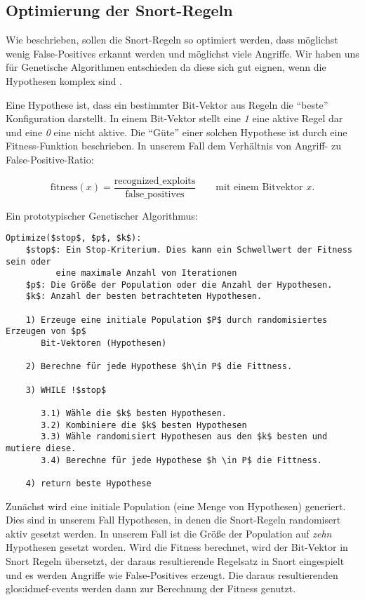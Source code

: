 \subsection{Optimierung der Snort-Regeln}
Wie beschrieben, sollen die Snort-Regeln so optimiert werden,
dass möglichst wenig False-Positives erkannt werden und
möglichst viele Angriffe. Wir haben uns für Genetische
Algorithmen entschieden da diese sich gut eignen, wenn
die Hypothesen komplex sind \cite{mitchel}.

Eine Hypothese ist, dass ein bestimmter Bit-Vektor aus Regeln
die \enquote{beste} Konfiguration darstellt. In einem Bit-Vektor
stellt eine \textit{1} eine aktive Regel dar und eine \textit{0}
eine nicht aktive. Die \enquote{Güte} einer solchen
Hypothese ist durch eine Fitness-Funktion beschrieben.
In unserem Fall dem Verhältnis von Angriff- zu False-Positive-Ratio:

\[
  \mathrm{fitness}(x) =
    \frac{\text{recognized\_exploits}}{\text{false\_positives}}
    \qquad\text{mit einem Bitvektor $x$.}
\]

Ein prototypischer Genetischer Algorithmus:

\begin{lstlisting}[language={},mathescape=true,
  caption={Prototypischer Genetischer Algorithmus frei nach \cite{mitchel}}]
  Optimize($stop$, $p$, $k$):
    $stop$: Ein Stop-Kriterium. Dies kann ein Schwellwert der Fitness sein oder
          eine maximale Anzahl von Iterationen
    $p$: Die Größe der Population oder die Anzahl der Hypothesen.
    $k$: Anzahl der besten betrachteten Hypothesen.

    1) Erzeuge eine initiale Population $P$ durch randomisiertes Erzeugen von $p$
       Bit-Vektoren (Hypothesen)

    2) Berechne für jede Hypothese $h\in P$ die Fittness.

    3) WHILE !$stop$

       3.1) Wähle die $k$ besten Hypothesen.
       3.2) Kombiniere die $k$ besten Hypothesen
       3.3) Wähle randomisiert Hypothesen aus den $k$ besten und mutiere diese.
       3.4) Berechne für jede Hypothese $h \in P$ die Fittness.

    4) return beste Hypothese
\end{lstlisting}

Zunächst wird eine initiale Population (eine Menge von Hypothesen)
generiert. Dies sind in unserem Fall Hypothesen, in denen
die Snort-Regeln randomisert aktiv gesetzt werden. In unserem
Fall ist die Größe der Population auf \textit{zehn} Hypothesen gesetzt worden.
Wird die Fitness berechnet, wird der Bit-Vektor in
Snort Regeln übersetzt, der daraus resultierende Regelsatz in Snort
eingespielt und es werden Angriffe wie False-Positives erzeugt.
Die daraus resultierenden \glspl{glos:idmef-event} werden dann zur Berechnung
der Fitness genutzt.

